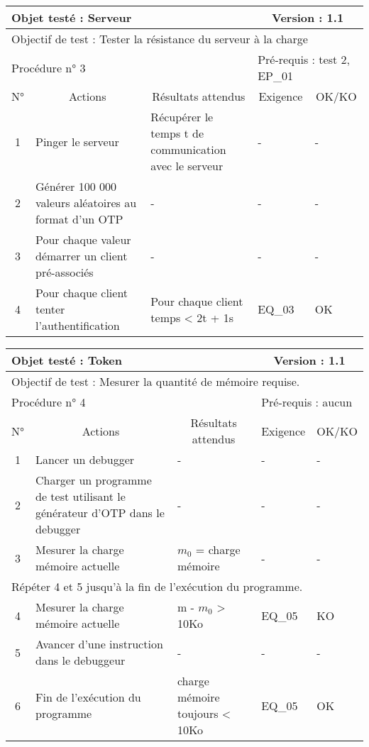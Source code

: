 \documentclass{"../../res/univ-projet"}
\begin{document}
\begin{center}
    \begin{tabular}{|c|p{5cm}|p{5cm}|p{1.5cm}|p{1.5cm}|}
      \hline
      \multicolumn{3}{|l|}{Objet testé : Serveur} & \multicolumn{2}{c|}{Version : 1.1}\\ \hline
      \multicolumn{5}{|l|}{Objectif de test : Tester la résistance du serveur à la charge}\\ \hline
      \multicolumn{3}{|l|}{Procédure n° 3} & \multicolumn{2}{p{3cm}|}{Pré-requis : test 2, EP\_01}\\ \hline
      \multicolumn{1}{|c|}{N°} & \multicolumn{1}{c|}{Actions} & \multicolumn{1}{c|}{Résultats attendus} & 
      \multicolumn{1}{c|}{Exigence} & \multicolumn{1}{c|}{OK/KO}\\ \hline
      1 & Pinger le serveur & Récupérer le temps t de communication avec le serveur & - & - \\
      2 & Générer 100 000 valeurs aléatoires au format d'un OTP & - & - & -\\
      3 & Pour chaque valeur démarrer un client pré-associés & - & - & -\\ \hline
      4 & Pour chaque client tenter l'authentification & Pour chaque client temps < 2t + 1s & EQ\_03 & OK\\ \hline
    \end{tabular}
    \vfill
    
    \begin{tabular}{|c|p{5cm}|p{5cm}|p{1.5cm}|p{1.5cm}|}
      \hline
      \multicolumn{3}{|l|}{Objet testé : Token} & \multicolumn{2}{c|}{Version : 1.1}\\ \hline
      \multicolumn{5}{|l|}{Objectif de test : Mesurer la quantité de mémoire requise.}\\ \hline
      \multicolumn{3}{|l|}{Procédure n° 4} & \multicolumn{2}{p{3cm}|}{Pré-requis : aucun}\\ \hline
      \multicolumn{1}{|c|}{N°} & \multicolumn{1}{c|}{Actions} & \multicolumn{1}{c|}{Résultats attendus} & 
      \multicolumn{1}{c|}{Exigence} & \multicolumn{1}{c|}{OK/KO}\\ \hline
      1 & Lancer un debugger & - & - & - \\
      2 & Charger un programme de test utilisant le générateur d'OTP dans le debugger & - & - & -\\
      3 & Mesurer la charge mémoire actuelle & $m_0$ = charge mémoire & - & -\\
      \hline
      \multicolumn{5}{|l|}{Répéter 4 et 5 jusqu'à la fin de l'exécution du programme.}\\
      \hline
      4 & Mesurer la charge mémoire actuelle & m - $m_0$ > 10Ko & EQ\_05 & KO\\
      5 & Avancer d'une instruction dans le debuggeur & - & - & -\\ \hline
      6 & Fin de l'exécution du programme & charge mémoire toujours < 10Ko & EQ\_05 & OK \\ \hline
    \end{tabular}
    \vfill
    

\end{center}
\end{document}
